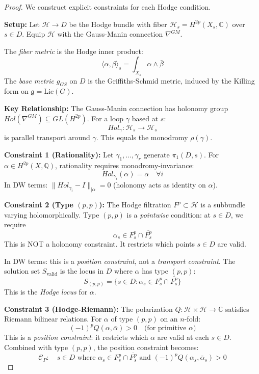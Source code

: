 \documentclass[12pt]{article}
\begin{document}
\begin{proof}
We construct explicit constraints for each Hodge condition.

\textbf{Setup:} Let $\mathcal{H} \to D$ be the Hodge bundle with fiber 
$\mathcal{H}_s = H^{2p}(X_s, \mathbb{C})$ over $s \in D$.
Equip $\mathcal{H}$ with the Gauss-Manin connection $\nabla^{GM}$.

The \emph{fiber metric} is the Hodge inner product:
\[
\langle\alpha, \beta\rangle_s = \int_{X_s} \alpha \wedge \bar{\beta}
\]
The \emph{base metric} $g_{GS}$ on $D$ is the Griffiths-Schmid metric, induced 
by the Killing form on $\mathfrak{g} = \text{Lie}(G)$.

\textbf{Key Relationship:} The Gauss-Manin connection has holonomy group 
$Hol(\nabla^{GM}) \subseteq GL(H^{2p})$. For a loop $\gamma$ based at $s$:
\[
Hol_\gamma: \mathcal{H}_s \to \mathcal{H}_s
\]
is parallel transport around $\gamma$. This equals the monodromy $\rho(\gamma)$.

\textbf{Constraint 1 (Rationality):}
Let $\gamma_1, \ldots, \gamma_r$ generate $\pi_1(D, s)$.
For $\alpha \in H^{2p}(X,\mathbb{Q})$, rationality requires monodromy-invariance:
\[
Hol_{\gamma_i}(\alpha) = \alpha \quad \forall i
\]
In DW terms: $\|Hol_{\gamma_i} - I\|_{|\alpha} = 0$ (holonomy acts as identity on $\alpha$).

\textbf{Constraint 2 (Type $(p,p)$):}
The Hodge filtration $F^p \subset \mathcal{H}$ is a subbundle varying holomorphically.
Type $(p,p)$ is a \emph{pointwise} condition: at $s \in D$, we require
\[
\alpha_s \in F^p_s \cap \overline{F^p_s}
\]
This is NOT a holonomy constraint. It restricts which points $s \in D$ are valid.

In DW terms: this is a \emph{position constraint}, not a \emph{transport constraint}.
The solution set $S_{\text{valid}}$ is the locus in $D$ where $\alpha$ has type $(p,p)$:
\[
S_{(p,p)} = \{s \in D : \alpha_s \in F^p_s \cap \overline{F^p_s}\}
\]
This is the \emph{Hodge locus} for $\alpha$.

\textbf{Constraint 3 (Hodge-Riemann):}
The polarization $Q: \mathcal{H} \times \mathcal{H} \to \mathbb{C}$ satisfies 
Riemann bilinear relations. For $\alpha$ of type $(p,p)$ on an $n$-fold:
\[
(-1)^p Q(\alpha, \bar{\alpha}) > 0 \quad \text{(for primitive } \alpha \text{)}
\]
This is a \emph{position constraint}: it restricts which $\alpha$ are valid at each $s \in D$.
Combined with type $(p,p)$, the position constraint becomes:
\[
\mathcal{C}_P: \quad s \in D \text{ where } \alpha_s \in F^p_s \cap \overline{F^p_s} 
\text{ and } (-1)^p Q(\alpha_s, \bar{\alpha}_s) > 0
\]
\end{proof}
\end{document}
